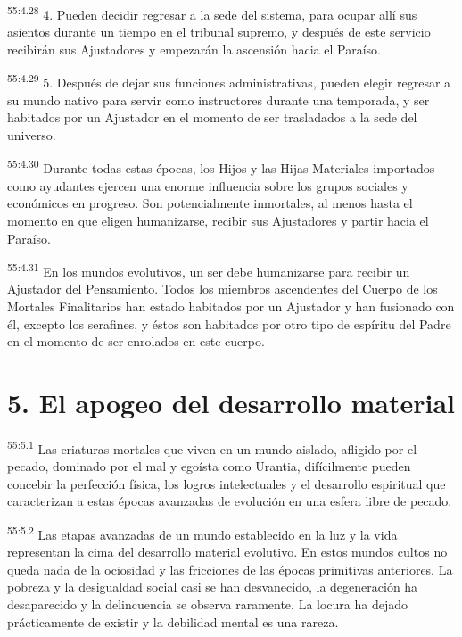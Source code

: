 \par
\textsuperscript{55:4.28} 4. Pueden decidir regresar a la sede del sistema, para ocupar allí sus asientos durante un tiempo en el tribunal supremo, y después de este servicio recibirán sus Ajustadores y empezarán la ascensión hacia el Paraíso.

\par
\textsuperscript{55:4.29} 5. Después de dejar sus funciones administrativas, pueden elegir regresar a su mundo nativo para servir como instructores durante una temporada, y ser habitados por un Ajustador en el momento de ser trasladados a la sede del universo.

\par
\textsuperscript{55:4.30} Durante todas estas épocas, los Hijos y las Hijas Materiales importados como ayudantes ejercen una enorme influencia sobre los grupos sociales y económicos en progreso. Son potencialmente inmortales, al menos hasta el momento en que eligen humanizarse, recibir sus Ajustadores y partir hacia el Paraíso.

\par
\textsuperscript{55:4.31} En los mundos evolutivos, un ser debe humanizarse para recibir un Ajustador del Pensamiento. Todos los miembros ascendentes del Cuerpo de los Mortales Finalitarios han estado habitados por un Ajustador y han fusionado con él, excepto los serafines, y éstos son habitados por otro tipo de espíritu del Padre en el momento de ser enrolados en este cuerpo.

\section*{5. El apogeo del desarrollo material}
\par
\textsuperscript{55:5.1} Las criaturas mortales que viven en un mundo aislado, afligido por el pecado, dominado por el mal y egoísta como Urantia, difícilmente pueden concebir la perfección física, los logros intelectuales y el desarrollo espiritual que caracterizan a estas épocas avanzadas de evolución en una esfera libre de pecado.

\par
\textsuperscript{55:5.2} Las etapas avanzadas de un mundo establecido en la luz y la vida representan la cima del desarrollo material evolutivo. En estos mundos cultos no queda nada de la ociosidad y las fricciones de las épocas primitivas anteriores. La pobreza y la desigualdad social casi se han desvanecido, la degeneración ha desaparecido y la delincuencia se observa raramente. La locura ha dejado prácticamente de existir y la debilidad mental es una rareza.


